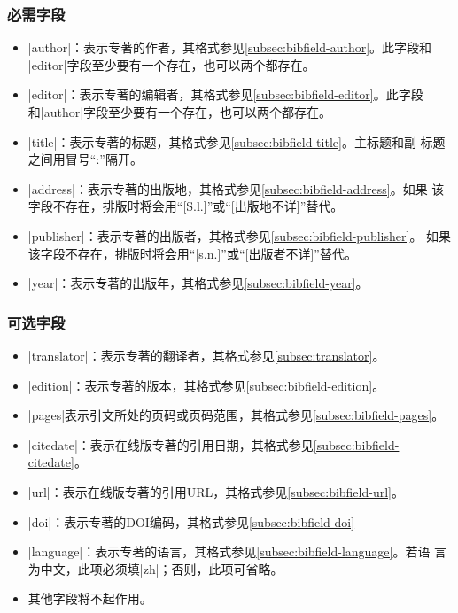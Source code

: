 \subsubsection{必需字段}

\begin{itemize}
\item |author|：表示专著的作者，其格式参见\ref{subsec:bibfield-author}。此字段和
  |editor|字段至少要有一个存在，也可以两个都存在。
\item |editor|：表示专著的编辑者，其格式参见\ref{subsec:bibfield-editor}。此字段
  和|author|字段至少要有一个存在，也可以两个都存在。
\item |title|：表示专著的标题，其格式参见\ref{subsec:bibfield-title}。主标题和副
  标题之间用冒号``:''隔开。
\item |address|：表示专著的出版地，其格式参见\ref{subsec:bibfield-address}。如果
  该字段不存在，{\BibTeX}排版时将会用``[S.l.]''或``[出版地不详]''替代。
\item |publisher|：表示专著的出版者，其格式参见\ref{subsec:bibfield-publisher}。
  如果该字段不存在，{\BibTeX}排版时将会用``[s.n.]''或``[出版者不详]''替代。
\item |year|：表示专著的出版年，其格式参见\ref{subsec:bibfield-year}。
\end{itemize}

\subsubsection{可选字段}

\begin{itemize}
\item |translator|：表示专著的翻译者，其格式参见\ref{subsec:translator}。
\item |edition|：表示专著的版本，其格式参见\ref{subsec:bibfield-edition}。
\item |pages|表示引文所处的页码或页码范围，其格式参见\ref{subsec:bibfield-pages}。
\item |citedate|：表示在线版专著的引用日期，其格式参见\ref{subsec:bibfield-citedate}。
\item |url|：表示在线版专著的引用URL，其格式参见\ref{subsec:bibfield-url}。
\item |doi|：表示专著的DOI编码，其格式参见\ref{subsec:bibfield-doi}
\item |language|：表示专著的语言，其格式参见\ref{subsec:bibfield-language}。若语
  言为中文，此项必须填|zh|；否则，此项可省略。
\item 其他字段将不起作用。
\end{itemize}

